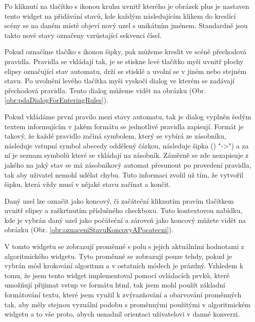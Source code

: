 Po kliknutí na tlačítko s ikonou kruhu uvnitř kterého je obrázek plus je nastaven tento widget na přidávání stavů, kde každým následujícím klikem do kreslící scény se na daném místě objeví nový uzel s unikátním jménem. Standardně jsou takto nové stavy označeny vzrůstající sekvencí čísel.

Pokud označíme tlačíko s ikonou šipky, pak můžeme kreslit ve scéně přechodová pravidla. Pravidla se vkládají tak, je se stiskne levé tlačítko myši uvnitř plochy elipsy označující stav automatu, drží se stisklé a uvolní se v jiném nebo stejném stavu. Po uvolnění levého tlačítka myši vyskočí dialog ve kterém se zadávají přechodová pravidla. Tento dialog můžeme vidět na obrázku (Obr. \ref{obr:pdaDialogForEnteringRules}). 


Pokud vkládáme první pravilo mezi stavy automatu, tak je dialog vyplněn šedým textem informujícím v jakém formátu se jednotlivé pravidla zapisují.
Formát je takový, že každé pravidlo začíná symbolem, který se vybírá ze zásobníku, následuje vstupní symbol abecedy oddělený čárkou, následuje šipka ()
"->") a za ní je seznam symbolů které se vkládají na zásobník. Záměrně se zde nezapisuje z jakého na jaký stav se má zásobníkový automat přesunout po provedení pravidla, tak aby uživatel nemohl udělat chybu. Tuto informaci zvolil už tím, že vytvořil šipku, která vždy musí v nějaké stavu začínat a končit.

Daný uzel lze označit jako koncový, či začáteční kliknutím pravím tlačítkem uvnitř elipsy a zaškrtnutím příslušného checkboxu. Tuto kontextovou nabídku, kde je vybrán daný uzel jako počáteční a zároveň jako koncový můžete vidět na obrázku (Obr. \ref{obr:oznaceniStavuKoncovyAPocatecni}).



V tomto widgetu se zobrazují proměnné s polu s jejich  aktuálními hodnotami z algoritmického widgetu. Tyto proměnné se zobrazují pouze tehdy, pokud je vybrán mód krokování algoritmu a v ostatních módech je prázdný. Vzhledem k tomu, že jsem tento widget implementoval pomocí ovládacích prvků, které umožňují přijimat vstup ve formátu html, tak jsem mohl použít základní formátování textu, které jsem využil k zvýrazňování a obarvování proměnných tak, aby měly stejnou vyzuální podobu s proměnnými použitými v algoritmickém widgetu a to vše proto, abych usnadnil orientaci uživatelovi v danné konverzi.

